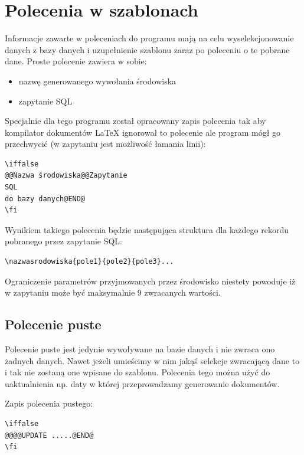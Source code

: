 \section{Polecenia w szablonach}

Informacje zawarte w poleceniach do programu mają na celu wyselekcjonowanie danych z bazy danych i uzupełnienie szablonu zaraz po poleceniu o te pobrane dane. Proste polecenie zawiera w sobie:
\begin{itemize}
\item nazwę generowanego wywołania środowiska
\item zapytanie SQL
\end{itemize}
Specjalnie dla tego programu został opracowany zapis polecenia tak aby kompilator dokumentów LaTeX ignorował to polecenie ale program mógł go przechwycić (w zapytaniu jest możliwość łamania linii):
\begin{lstlisting}
\iffalse 
@@Nazwa środowiska@@Zapytanie
SQL
do bazy danych@END@
\fi
\end{lstlisting}
Wynikiem takiego polecenia będzie następująca struktura dla każdego rekordu pobranego przez zapytanie SQL:
\begin{lstlisting}
\nazwasrodowiska{pole1}{pole2}{pole3}...
\end{lstlisting}
Ograniczenie parametrów przyjmowanych przez środowisko niestety powoduje iż w zapytaniu może być maksymalnie 9 zwracanych wartości.

\subsection{Polecenie puste}
Polecenie puste jest jedynie wywoływane na bazie danych i nie zwraca ono żadnych danych. Nawet jeżeli umieścimy w nim jakąś selekcje zwracającą dane to i tak nie zostaną one wpisane do szablonu. Polecenia tego można użyć do uaktualnienia np. daty w której przeprowadzamy generowanie dokumentów.
\par
Zapis polecenia pustego:
\begin{lstlisting}
\iffalse 
@@@@UPDATE .....@END@
\fi
\end{lstlisting}

